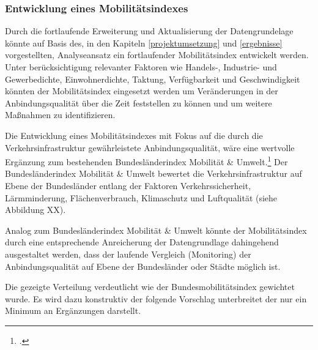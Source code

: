 
\subsubsection{Entwicklung eines Mobilitätsindexes}
Durch die fortlaufende Erweiterung und Aktualisierung der Datengrundelage könnte auf Basis des, in den Kapiteln \ref{projektumsetzung} und \ref{ergebnisse} vorgestellten, Analyseansatz ein fortlaufender Mobilitätsindex entwickelt werden. Unter berücksichtigung relevanter Faktoren wie Handels-, Industrie- und Gewerbedichte, Einwohnerdichte, Taktung, Verfügbarkeit und Geschwindigkeit könnten der Mobilitätsindex eingesetzt werden um Veränderungen in der Anbindungsqualität über die Zeit feststellen zu können und um weitere Maßnahmen zu identifizieren. 

Die Entwicklung eines Mobilitätsindexes mit Fokus auf die durch die Verkehrsinfrastruktur gewährleistete Anbindungsqualität, wäre eine wertvolle Ergänzung zum bestehenden Bundesländerindex Mobilität \& Umwelt.\footcite{Bundeslaenderindex:3} Der Bundesländerindex Mobilität \& Umwelt bewertet die Verkehrsinfrastruktur auf Ebene der Bundesländer entlang der Faktoren Verkehrssicherheit, Lärmminderung, Flächenverbrauch, Klimaschutz und Luftqualität (siehe Abbildung XX). 


Analog zum Bundesländerindex Mobilität \& Umwelt könnte der Mobilitätsindex durch eine entsprechende Anreicherung der Datengrundlage dahingehend ausgestaltet werden, dass der laufende Vergleich (Monitoring) der Anbindungsqualität auf Ebene der Bundesländer oder Städte möglich ist. 


Die gezeigte Verteilung verdeutlicht wie der Bundesmobilitätsindex gewichtet wurde. Es wird dazu konstruktiv der folgende Vorschlag unterbreitet der nur ein Minimum an Ergänzungen darstellt.


